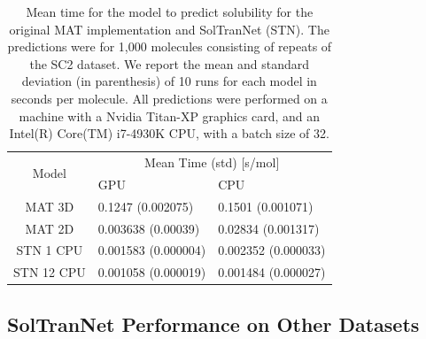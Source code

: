\documentclass[journal=jcim,manuscript=applicationnotes]{achemso}
\begin{document}
\begin{table}
    \begin{tabular}{|c|l|l|}
        \hline
        \multirow{2}{*}{Model}    & \multicolumn{2}{c|}{Mean Time (std) [s/mol]} \\ 
        \cline{2-3}
          &  GPU & CPU \\
         \hline
         MAT 3D & 0.1247 (0.002075) & 0.1501 (0.001071) \\
         MAT 2D & 0.003638 (0.00039) & 0.02834 (0.001317) \\
         STN 1 CPU & 0.001583 (0.000004) & 0.002352 (0.000033)\\
         STN 12 CPU & 0.001058 (0.000019) & 0.001484 (0.000027)\\
         \hline
    \end{tabular}
    \caption{Mean time for the model to predict solubility for the original MAT implementation and SolTranNet (STN). The predictions were for 1,000 molecules consisting of repeats of the SC2 dataset. We report the mean and standard deviation (in parenthesis) of 10 runs for each model in seconds per molecule. All predictions were performed on a machine with a Nvidia Titan-XP graphics card, and an Intel(R) Core(TM) i7-4930K CPU, with a batch size of 32.}
    \label{tab:timings}
\end{table}


\subsection{SolTranNet Performance on Other Datasets}
\end{document}
